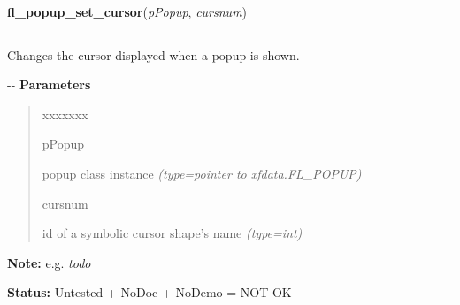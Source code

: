     \label{xformslib:flpopup:fl_popup_set_cursor}

    \vspace{0.5ex}

\hspace{.8\funcindent}\begin{boxedminipage}{\funcwidth}

    \raggedright \textbf{fl\_popup\_set\_cursor}(\textit{pPopup}, \textit{cursnum})

    \vspace{-1.5ex}

    \rule{\textwidth}{0.5\fboxrule}
\setlength{\parskip}{2ex}

Changes the cursor displayed when a popup is shown.

-{}-
\setlength{\parskip}{1ex}
      \textbf{Parameters}
      \vspace{-1ex}

      \begin{quote}
        \begin{Ventry}{xxxxxxx}

          \item[pPopup]


popup class instance
            {\it (type=pointer to xfdata.FL\_POPUP)}

          \item[cursnum]


id of a symbolic cursor shape's name
            {\it (type=int)}

        \end{Ventry}

      \end{quote}

\textbf{Note:} 
e.g. \emph{todo}


\textbf{Status:} 
Untested + NoDoc + NoDemo = NOT OK


    \end{boxedminipage}

    \label{xformslib:flpopup:fl_popup_get_title}

    \vspace{0.5ex}

